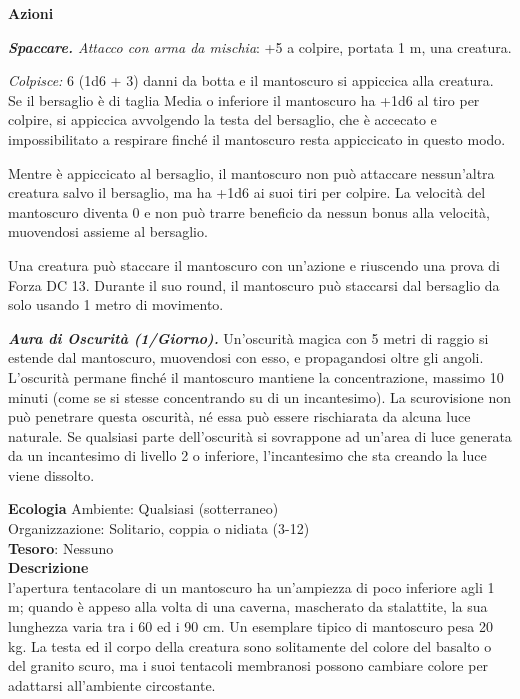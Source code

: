 \begin{multicols}{2}
	\textbf{Azioni}

	\textit{\textbf{Spaccare.} Attacco con arma da mischia}: +5 a colpire, portata 1 m, una creatura.

	\textit{Colpisce:} 6 (1d6 + 3) danni da botta e il mantoscuro si appiccica alla creatura. Se il bersaglio è di taglia Media o inferiore il mantoscuro ha +1d6 al tiro per colpire, si appiccica avvolgendo la testa del bersaglio, che è accecato e impossibilitato a respirare finché il mantoscuro resta appiccicato in questo modo.

	Mentre è appiccicato al bersaglio, il mantoscuro non può attaccare nessun'altra creatura salvo il bersaglio, ma ha +1d6 ai suoi tiri per colpire. La velocità del mantoscuro diventa 0 e non può trarre beneficio da nessun bonus alla velocità, muovendosi assieme al bersaglio.

	Una creatura può staccare il mantoscuro con un'azione e riuscendo una prova di Forza DC 13. Durante il suo round, il mantoscuro può staccarsi dal bersaglio da solo usando 1 metro di movimento.

	\textit{\textbf{Aura di Oscurità (1/Giorno).}} Un'oscurità magica con 5 metri di raggio si estende dal mantoscuro, muovendosi con esso, e propagandosi oltre gli angoli. L'oscurità permane finché il mantoscuro mantiene la concentrazione, massimo 10 minuti (come se si stesse concentrando su di un incantesimo). La scurovisione non può penetrare questa oscurità, né essa può essere rischiarata da alcuna luce naturale. Se qualsiasi parte dell'oscurità si sovrappone ad un'area di luce generata da un incantesimo di livello 2 o inferiore, l'incantesimo che sta creando la luce viene dissolto.

	\textbf{Ecologia}
	Ambiente: Qualsiasi (sotterraneo)\\
	Organizzazione: Solitario, coppia o nidiata (3-12)\\
	\textbf{Tesoro}: Nessuno\\
	\textbf{Descrizione}\\
	l'apertura tentacolare di un mantoscuro ha un'ampiezza di poco inferiore agli 1 m; quando è appeso alla volta di una caverna, mascherato da stalattite, la sua lunghezza varia tra i 60 ed i 90 cm. Un esemplare tipico di mantoscuro pesa 20 kg. La testa ed il corpo della creatura sono solitamente del colore del basalto o del granito scuro, ma i suoi tentacoli membranosi possono cambiare colore per adattarsi all'ambiente circostante.


\end{multicols}
